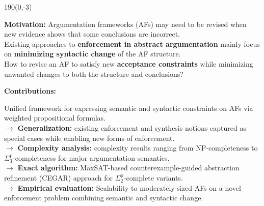 \documentclass[a4paper]{article} %
\begin{document}
\begin{textblock}{190}(0,-3)
\sffamily
\small

\begin{framed}
{\bf Motivation: } Argumentation frameworks (AFs) may need to be revised when new evidence shows that some conclusions are incorrect.\\
Existing approaches to \textbf{enforcement in abstract argumentation} mainly focus on \textbf{minimizing syntactic change} of the AF structure.\\
How to revise an AF to satisfy new \textbf{acceptance constraints} while minimizing unwanted changes to both the structure and conclusions?
\medskip

\textbf{Contributions:}

Unified framework for expressing semantic and syntactic constraints on AFs via weighted propositional formulas.\\
$\rightarrow$ \textbf{Generalization:} existing enforcement and synthesis notions captured as special cases while enabling new forms of enforcement.\\
$\rightarrow$  \textbf{Complexity analysis:} complexity results ranging from NP-completeness to $\Sigma_3^{\text{p}}$-completeness for major argumentation semantics.\\
$\rightarrow$ \textbf{Exact algorithm:} MaxSAT-based counterexample-guided abstraction refinement (CEGAR) approach for $\Sigma_2^{\text{p}}$-complete variants.\\ 
$\rightarrow$ \textbf{Empirical evaluation:} Scalability to moderately-sized AFs on a novel enforcement problem combining semantic and syntactic change.
\end{framed}
\end{textblock}

%


\end{document}
